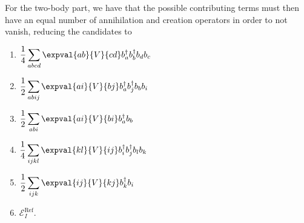 For the two-body part, we have that the possible contributing terms must then have an equal number of annihilation and creation operators in order to not vanish, reducing the candidates to
\begin{multicols}{2}{}
    \begin{enumerate}
        \item  $\displaystyle\frac{1}{4} \sum_{abcd} \expval{ab}{V}{cd} b_a^\dagger b_b^\dagger b_d b_c$
        \item  $\displaystyle\frac{1}{2} \sum_{abij} \expval{ai}{V}{bj} b_a^\dagger b_j^\dagger b_b b_i$
        \item  $\displaystyle\frac{1}{2} \sum_{abi} \expval{ai}{V}{bi} b_a^\dagger b_b$
        \item  $\displaystyle\frac{1}{4} \sum_{ijkl} \expval{kl}{V}{ij} b_i^\dagger b_j^\dagger b_l b_k$
        \item  $\displaystyle\frac{1}{2} \sum_{ijk} \expval{ij}{V}{kj} b_k^\dagger b_i$
        \item  $\displaystyle\mathcal{E}_I^\text{Ref}$.
    \end{enumerate}
\end{multicols}

